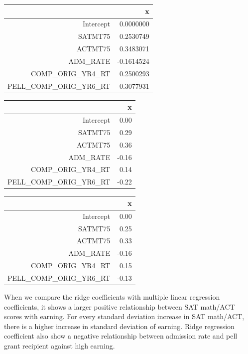 \documentclass{article}
\begin{document}
\begin{table}[ht]
\centering
\begin{tabular}{rr}
  \hline
 & x \\ 
  \hline
Intercept & 0.0000000 \\ 
  SATMT75 & 0.2530749 \\ 
  ACTMT75 & 0.3483071 \\ 
  ADM\_RATE & -0.1614524 \\ 
  COMP\_ORIG\_YR4\_RT & 0.2500293 \\ 
  PELL\_COMP\_ORIG\_YR6\_RT & -0.3077931 \\ 
   \hline
\end{tabular}
\end{table}%
\begin{table}[ht]
\centering
\begin{tabular}{rr}
  \hline
 & x \\ 
  \hline
Intercept & 0.00 \\ 
  SATMT75 & 0.29 \\ 
  ACTMT75 & 0.36 \\ 
  ADM\_RATE & -0.16 \\ 
  COMP\_ORIG\_YR4\_RT & 0.14 \\ 
  PELL\_COMP\_ORIG\_YR6\_RT & -0.22 \\ 
   \hline
\end{tabular}
\end{table}%
\begin{table}[ht]
\centering
\begin{tabular}{rr}
  \hline
 & x \\ 
  \hline
Intercept & 0.00 \\ 
  SATMT75 & 0.25 \\ 
  ACTMT75 & 0.33 \\ 
  ADM\_RATE & -0.16 \\ 
  COMP\_ORIG\_YR4\_RT & 0.15 \\ 
  PELL\_COMP\_ORIG\_YR6\_RT & -0.13 \\ 
   \hline
\end{tabular}
\end{table}
When we compare the ridge coefficients with multiple linear regression coefficients, it shows a larger positive relationship between SAT math/ACT scores with earning. For every standard deviation increase in SAT math/ACT, there is a higher increase in standard deviation of earning. Ridge regression coefficient also show a negative relationship between admission rate and pell grant recipient against high earning.
\newline
\newline
\end{document}
